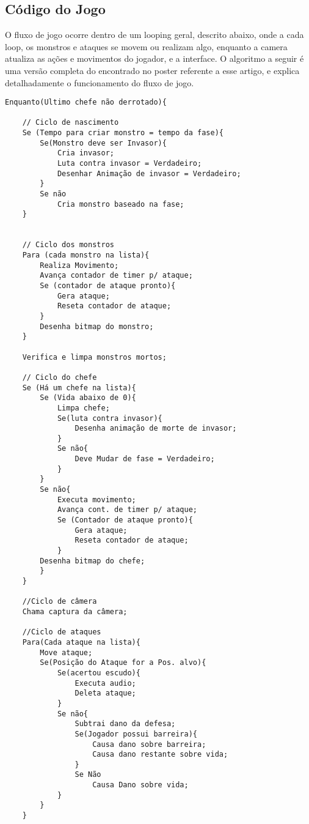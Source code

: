 \documentclass[12pt]{article}
\begin{document}
\subsection{Código do Jogo}
O fluxo de jogo ocorre dentro de um looping geral, descrito abaixo, onde a cada loop, os monstros e ataques se movem ou realizam algo, enquanto a camera atualiza as ações e movimentos do jogador, e a interface. O algoritmo a seguir é uma versão completa do encontrado no poster referente a esse artigo, e explica detalhadamente o funcionamento do fluxo de jogo.

\begin{lstlisting}
Enquanto(Ultimo chefe não derrotado){

    // Ciclo de nascimento
    Se (Tempo para criar monstro = tempo da fase){
        Se(Monstro deve ser Invasor){
            Cria invasor;
            Luta contra invasor = Verdadeiro;
            Desenhar Animação de invasor = Verdadeiro;
        }
        Se não
            Cria monstro baseado na fase;
    }
    
    
    // Ciclo dos monstros
    Para (cada monstro na lista){
        Realiza Movimento;
        Avança contador de timer p/ ataque;
        Se (contador de ataque pronto){
            Gera ataque;
            Reseta contador de ataque;
        }
        Desenha bitmap do monstro;
    }
    
    Verifica e limpa monstros mortos;
    
    // Ciclo do chefe
    Se (Há um chefe na lista){
        Se (Vida abaixo de 0){
            Limpa chefe;
            Se(luta contra invasor){    
                Desenha animação de morte de invasor;
            }
            Se não{
                Deve Mudar de fase = Verdadeiro;
            }
        }
        Se não{
            Executa movimento;
            Avança cont. de timer p/ ataque;
            Se (Contador de ataque pronto){
                Gera ataque;
                Reseta contador de ataque;
            }
        Desenha bitmap do chefe;
        }
    }
    
    //Ciclo de câmera
    Chama captura da câmera;
    
    //Ciclo de ataques
    Para(Cada ataque na lista){
        Move ataque;
        Se(Posição do Ataque for a Pos. alvo){
            Se(acertou escudo){
                Executa audio;
                Deleta ataque;
            }
            Se não{
                Subtrai dano da defesa;
                Se(Jogador possui barreira){
                    Causa dano sobre barreira;
                    Causa dano restante sobre vida;
                }
                Se Não
                    Causa Dano sobre vida;
            }
        }
    }
    

\end{lstlisting}
\end{document}

